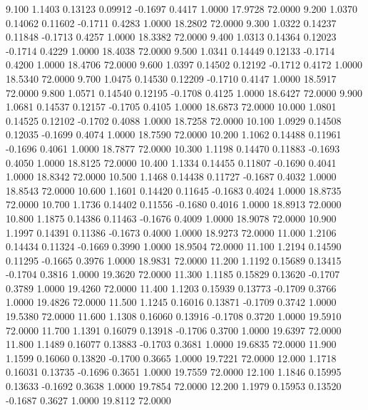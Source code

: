    9.100   1.1403   0.13123   0.09912  -0.1697   0.4417   1.0000  17.9728  72.0000
   9.200   1.0370   0.14062   0.11602  -0.1711   0.4283   1.0000  18.2802  72.0000
   9.300   1.0322   0.14237   0.11848  -0.1713   0.4257   1.0000  18.3382  72.0000
   9.400   1.0313   0.14364   0.12023  -0.1714   0.4229   1.0000  18.4038  72.0000
   9.500   1.0341   0.14449   0.12133  -0.1714   0.4200   1.0000  18.4706  72.0000
   9.600   1.0397   0.14502   0.12192  -0.1712   0.4172   1.0000  18.5340  72.0000
   9.700   1.0475   0.14530   0.12209  -0.1710   0.4147   1.0000  18.5917  72.0000
   9.800   1.0571   0.14540   0.12195  -0.1708   0.4125   1.0000  18.6427  72.0000
   9.900   1.0681   0.14537   0.12157  -0.1705   0.4105   1.0000  18.6873  72.0000
  10.000   1.0801   0.14525   0.12102  -0.1702   0.4088   1.0000  18.7258  72.0000
  10.100   1.0929   0.14508   0.12035  -0.1699   0.4074   1.0000  18.7590  72.0000
  10.200   1.1062   0.14488   0.11961  -0.1696   0.4061   1.0000  18.7877  72.0000
  10.300   1.1198   0.14470   0.11883  -0.1693   0.4050   1.0000  18.8125  72.0000
  10.400   1.1334   0.14455   0.11807  -0.1690   0.4041   1.0000  18.8342  72.0000
  10.500   1.1468   0.14438   0.11727  -0.1687   0.4032   1.0000  18.8543  72.0000
  10.600   1.1601   0.14420   0.11645  -0.1683   0.4024   1.0000  18.8735  72.0000
  10.700   1.1736   0.14402   0.11556  -0.1680   0.4016   1.0000  18.8913  72.0000
  10.800   1.1875   0.14386   0.11463  -0.1676   0.4009   1.0000  18.9078  72.0000
  10.900   1.1997   0.14391   0.11386  -0.1673   0.4000   1.0000  18.9273  72.0000
  11.000   1.2106   0.14434   0.11324  -0.1669   0.3990   1.0000  18.9504  72.0000
  11.100   1.2194   0.14590   0.11295  -0.1665   0.3976   1.0000  18.9831  72.0000
  11.200   1.1192   0.15689   0.13415  -0.1704   0.3816   1.0000  19.3620  72.0000
  11.300   1.1185   0.15829   0.13620  -0.1707   0.3789   1.0000  19.4260  72.0000
  11.400   1.1203   0.15939   0.13773  -0.1709   0.3766   1.0000  19.4826  72.0000
  11.500   1.1245   0.16016   0.13871  -0.1709   0.3742   1.0000  19.5380  72.0000
  11.600   1.1308   0.16060   0.13916  -0.1708   0.3720   1.0000  19.5910  72.0000
  11.700   1.1391   0.16079   0.13918  -0.1706   0.3700   1.0000  19.6397  72.0000
  11.800   1.1489   0.16077   0.13883  -0.1703   0.3681   1.0000  19.6835  72.0000
  11.900   1.1599   0.16060   0.13820  -0.1700   0.3665   1.0000  19.7221  72.0000
  12.000   1.1718   0.16031   0.13735  -0.1696   0.3651   1.0000  19.7559  72.0000
  12.100   1.1846   0.15995   0.13633  -0.1692   0.3638   1.0000  19.7854  72.0000
  12.200   1.1979   0.15953   0.13520  -0.1687   0.3627   1.0000  19.8112  72.0000
